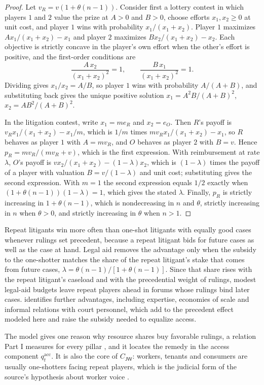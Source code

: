 \documentclass[11pt,letterpaper]{article}
\theoremstyle{definition}
\theoremstyle{remark}
\newcommand{\pJ}{\mathsf{J}}
\newcommand{\pW}{\mathsf{W}}
\begin{document}
\begin{proof}
Let $v_R=v(1+\theta(n-1))$. Consider first a lottery contest in which players $1$ and $2$ value the prize at $A>0$ and $B>0$, choose efforts $x_1,x_2\ge 0$ at unit cost, and player $1$ wins with probability $x_1/(x_1+x_2)$. Player $1$ maximizes $Ax_1/(x_1+x_2)-x_1$ and player $2$ maximizes $Bx_2/(x_1+x_2)-x_2$. Each objective is strictly concave in the player's own effort when the other's effort is positive, and the first-order conditions are
\[
\frac{A\,x_2}{(x_1+x_2)^2}=1,\qquad \frac{B\,x_1}{(x_1+x_2)^2}=1.
\]
Dividing gives $x_1/x_2=A/B$, so player $1$ wins with probability $A/(A+B)$, and substituting back gives the unique positive solution $x_1=A^2B/(A+B)^2$, $x_2=AB^2/(A+B)^2$.

In the litigation contest, write $x_1=me_R$ and $x_2=e_O$. Then $R$'s payoff is $v_Rx_1/(x_1+x_2)-x_1/m$, which is $1/m$ times $mv_Rx_1/(x_1+x_2)-x_1$, so $R$ behaves as player $1$ with $A=mv_R$, and $O$ behaves as player $2$ with $B=v$. Hence $p_R=mv_R/(mv_R+v)$, which is the first expression. With reimbursement at rate $\lambda$, $O$'s payoff is $vx_2/(x_1+x_2)-(1-\lambda)x_2$, which is $(1-\lambda)$ times the payoff of a player with valuation $B=v/(1-\lambda)$ and unit cost; substituting gives the second expression. With $m=1$ the second expression equals $1/2$ exactly when $(1+\theta(n-1))(1-\lambda)=1$, which gives the stated $\lambda$. Finally, $p_R$ is strictly increasing in $1+\theta(n-1)$, which is nondecreasing in $n$ and $\theta$, strictly increasing in $n$ when $\theta>0$, and strictly increasing in $\theta$ when $n>1$.
\end{proof}

Repeat litigants win more often than one-shot litigants with equally good cases whenever rulings set precedent, because a repeat litigant bids for future cases as well as the case at hand. Legal aid removes the advantage only when the subsidy to the one-shotter matches the share of the repeat litigant's stake that comes from future cases, $\lambda=\theta(n-1)/[1+\theta(n-1)]$. Since that share rises with the repeat litigant's caseload and with the precedential weight of rulings, modest legal-aid budgets leave repeat players ahead in forums whose rulings bind later cases. \citet{galanter1974} identifies further advantages, including expertise, economies of scale and informal relations with court personnel, which add to the precedent effect modeled here and raise the subsidy needed to equalize access.

The model gives one reason why resource shares buy favorable rulings, a relation Part I measures for every pillar \citep{long2026financial}, and it locates the remedy in the access component $q^{\mathrm{acc}}_t$. It is also the core of $C_{\pJ\pW}$: workers, tenants and consumers are usually one-shotters facing repeat players, which is the judicial form of the source's hypothesis about worker voice \citep{largo2026hbs}.
\end{document}
